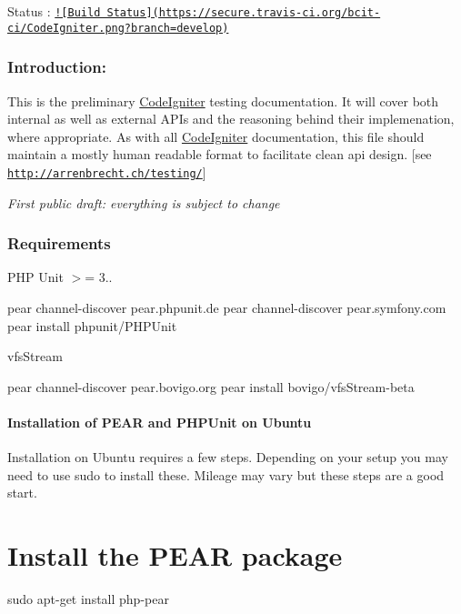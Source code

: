 Status \+: \href{http://travis-ci.org/bcit-ci/CodeIgniter}{\tt !\mbox{[}Build Status\mbox{]}(https\+://secure.\+travis-\/ci.\+org/bcit-\/ci/\+Code\+Igniter.\+png?branch=develop)}

\subsubsection*{Introduction\+:}

This is the preliminary \hyperlink{namespace_code_igniter}{Code\+Igniter} testing documentation. It will cover both internal as well as external A\+P\+Is and the reasoning behind their implemenation, where appropriate. As with all \hyperlink{namespace_code_igniter}{Code\+Igniter} documentation, this file should maintain a mostly human readable format to facilitate clean api design. \mbox{[}see \href{http://arrenbrecht.ch/testing/}{\tt http\+://arrenbrecht.\+ch/testing/}\mbox{]}

{\itshape First public draft\+: everything is subject to change}

\subsubsection*{Requirements}

P\+H\+P Unit $>$= 3.. \begin{DoxyVerb}pear channel-discover pear.phpunit.de
pear channel-discover pear.symfony.com
pear install phpunit/PHPUnit
\end{DoxyVerb}


vfs\+Stream \begin{DoxyVerb}pear channel-discover pear.bovigo.org
pear install bovigo/vfsStream-beta
\end{DoxyVerb}


\paragraph*{Installation of P\+E\+A\+R and P\+H\+P\+Unit on Ubuntu}

Installation on Ubuntu requires a few steps. Depending on your setup you may need to use \textquotesingle{}sudo\textquotesingle{} to install these. Mileage may vary but these steps are a good start.

\section*{Install the P\+E\+A\+R package}

sudo apt-\/get install php-\/pear


